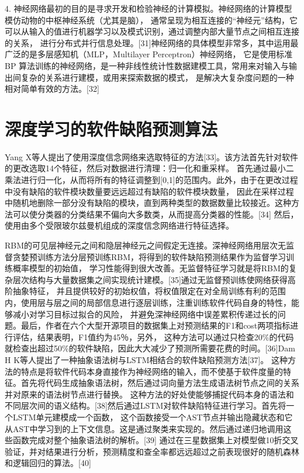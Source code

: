 \documentclass[12pt, a4paper]{article}
\begin{document}
4. 神经网络最初的目的是寻求开发和检验神经的计算模拟。神经网络的计算模型模仿动物的中枢神经系统（尤其是脑），
通常呈现为相互连接的“神经元”结构，它可以从输入的值进行机器学习以及模式识别，通过调整内部大量节点之间相互连接的关系，
进行分布式并行信息处理。[31]神经网络的具体模型非常多，其中运用最广泛的是多层感知机（MLP，Multilayer Perceptron）神经网络，
它是使用标准BP 算法训练的神经网络，是一种非线性统计性数据建模工具，常用来对输入与输出间复杂的关系进行建模，或用来探索数据的模式，
是解决大复杂度问题的一种相对简单有效的方法。[32]

\section{深度学习的软件缺陷预测算法}

Yang X等人提出了使用深度信念网络来选取特征的方法[33]。该方法首先针对软件的更改选取14个特征，然后对数据进行清理：归一化和重采样。
首先通过最小二乘法进行归一化，从而将所有的特征调整到[0,1]的范围内。此外，由于在更改过程中没有缺陷的软件模块数量要远远超过有缺陷的软件模块数量，
因此在采样过程中随机地删除一部分没有缺陷的模块，直到两种类型的数据数量比较接近。这种方法可以使分类器的分类结果不偏向大多数类，从而提高分类器的性能。[34]
然后，使用由多个受限玻尔兹曼机组成的深度信念网络进行特征选择。

RBM的可见层神经元之间和隐层神经元之间假定无连接。深神经网络用层次无监督贪婪预训练方法分层预训练RBM，将得到的软件缺陷预测结果作为监督学习训练概率模型的初始值，
学习性能得到很大改善。无监督特征学习就是将RBM的复杂层次结构与大量数据集之间实现统计建模。[35]通过无监督预训练使网络获得高阶抽象特征，
并且提供较好的初始权值，将权值限定在对全局训练有利的范围内，使用层与层之间的局部信息进行逐层训练，注重训练软件代码自身的特性，能够减小对学习目标过拟合的风险，
并避免深神经网络中误差累积传递过长的问题。最后，作者在六个大型开源项目的数据集上对预测结果的F1和cost两项指标进行评估，结果表明，F1值约为45％，另外，
这种方法可以通过只检查20\%的代码就检查出超过50\%的软件缺陷，因此大大减少了预测所需要花费的时间。[36]Dam H K等人提出了一种抽象语法树与LSTM相结合的软件缺陷预测方法[37]。
这种方法的特点是将软件代码本身直接作为神经网络的输入，而不使基于软件度量的特征。首先将代码生成抽象语法树，然后通过词向量方法生成语法树节点之间的关系并对原来的语法树节点进行替换。
这种方法的好处使能够捕捉代码本身的语法和不同层次间的语义结构。[38]然后通过LSTM对软件缺陷特征进行学习。首先将一个LSTM单元建模成一个函数，
这个函数接受一个AST节点并输出隐藏状态和它从AST中学习到的上下文信息。这是通过聚类来实现的。然后通过递归地调用这些函数完成对整个抽象语法树的解析。[39]
通过在三星数据集上对模型做10折交叉验证，并对结果进行分析，预测精度和查全率都远远超过之前表现很好的随机森林和逻辑回归的算法。[40]
\end{document}
